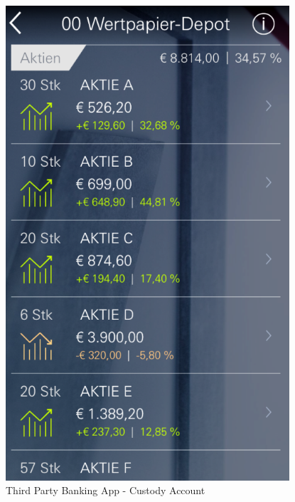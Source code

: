 \begin{figure}[H]
\begin{minipage}[b]{.5\linewidth}
        \centering\includegraphics[width=0.94\textwidth]{img/screenshots/ex4p4.png}
    \end{minipage}
	\captionsetup{labelformat=empty}
    \caption[]{Third Party Banking App - Custody Account}
\end{figure}
